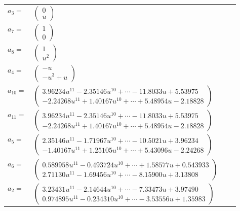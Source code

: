 \documentclass[1p]{elsarticle_modified}
\theoremstyle{definition}
\begin{document}
\begin{tabular}{m{7pt} m{180pt} m{7pt} m{180pt} }
\flushright $a_{3}=$&$\begin{pmatrix}0\\u\end{pmatrix}$ \\
\flushright $a_{7}=$&$\begin{pmatrix}1\\0\end{pmatrix}$ \\
\flushright $a_{8}=$&$\begin{pmatrix}1\\u^2\end{pmatrix}$ \\
\flushright $a_{4}=$&$\begin{pmatrix}- u\\- u^3+u\end{pmatrix}$ \\
\flushright $a_{10}=$&$\begin{pmatrix}3.96234 u^{11}-2.35146 u^{10}+\cdots-11.8033 u+5.53975\\-2.24268 u^{11}+1.40167 u^{10}+\cdots+5.48954 u-2.18828\end{pmatrix}$ \\
\flushright $a_{11}=$&$\begin{pmatrix}3.96234 u^{11}-2.35146 u^{10}+\cdots-11.8033 u+5.53975\\-2.24268 u^{11}+1.40167 u^{10}+\cdots+5.48954 u-2.18828\end{pmatrix}$ \\
\flushright $a_{5}=$&$\begin{pmatrix}2.35146 u^{11}-1.71967 u^{10}+\cdots-10.5021 u+3.96234\\-1.40167 u^{11}+1.25105 u^{10}+\cdots+5.43096 u-2.24268\end{pmatrix}$ \\
\flushright $a_{6}=$&$\begin{pmatrix}0.589958 u^{11}-0.493724 u^{10}+\cdots+1.58577 u+0.543933\\2.71130 u^{11}-1.69456 u^{10}+\cdots-8.15900 u+3.13808\end{pmatrix}$ \\
\flushright $a_{2}=$&$\begin{pmatrix}3.23431 u^{11}-2.14644 u^{10}+\cdots-7.33473 u+3.97490\\0.974895 u^{11}-0.234310 u^{10}+\cdots-3.53556 u+1.35983\end{pmatrix}$ \\

\end{tabular}
\end{document}
